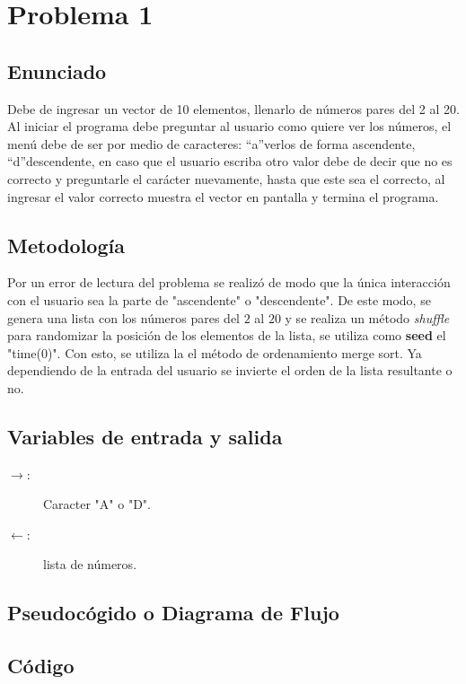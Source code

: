 \section{Problema 1}
\subsection{Enunciado}
Debe de ingresar un vector de 10 elementos, llenarlo de números pares del 2 al 20. Al iniciar el
programa debe preguntar al usuario como quiere ver los números, el menú debe de ser por medio de
caracteres: “a”verlos de forma ascendente, “d”descendente, en caso que el usuario escriba otro valor
debe de decir que no es correcto y preguntarle el carácter nuevamente, hasta que este sea el correcto,
al ingresar el valor correcto muestra el vector en pantalla y termina el programa.

\subsection{Metodología}
Por un error de lectura del problema se realizó de modo que la única interacción con el usuario sea la parte de "ascendente" o "descendente". De este modo, se genera una lista con los números pares del $2$ al $20$ y se realiza un método \textit{shuffle} para randomizar la posición de los elementos de la lista, se utiliza como \textbf{seed} el "time(0)". Con esto, se utiliza la el método de ordenamiento merge sort. Ya dependiendo de la entrada del usuario se invierte el orden de la lista resultante o no.

\subsection{Variables de entrada y salida}
\begin{description}
	\item[$\rightarrow$: ] Caracter "A" o "D".
	\item[$\leftarrow$: ] lista de números. 
\end{description}

\subsection{Pseudocógido o Diagrama de Flujo}

\subsection{Código}



